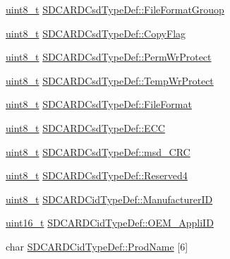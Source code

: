 \begin{DoxyCompactItemize}
\item 
\hyperlink{stdint_8h_aba7bc1797add20fe3efdf37ced1182c5}{uint8\-\_\-t} \hyperlink{group___p_i_o_s___s_d_c_a_r_d_ga19785f76dae23ac16c7af85cc6c88460}{S\-D\-C\-A\-R\-D\-Csd\-Type\-Def\-::\-File\-Format\-Grouop}
\item 
\hyperlink{stdint_8h_aba7bc1797add20fe3efdf37ced1182c5}{uint8\-\_\-t} \hyperlink{group___p_i_o_s___s_d_c_a_r_d_ga24efbbd2c557f214a8bfcec06ce30d19}{S\-D\-C\-A\-R\-D\-Csd\-Type\-Def\-::\-Copy\-Flag}
\item 
\hyperlink{stdint_8h_aba7bc1797add20fe3efdf37ced1182c5}{uint8\-\_\-t} \hyperlink{group___p_i_o_s___s_d_c_a_r_d_ga191082389493442ce0b103f97282b952}{S\-D\-C\-A\-R\-D\-Csd\-Type\-Def\-::\-Perm\-Wr\-Protect}
\item 
\hyperlink{stdint_8h_aba7bc1797add20fe3efdf37ced1182c5}{uint8\-\_\-t} \hyperlink{group___p_i_o_s___s_d_c_a_r_d_ga3a9535629b4573d3dbe39dabd51b341a}{S\-D\-C\-A\-R\-D\-Csd\-Type\-Def\-::\-Temp\-Wr\-Protect}
\item 
\hyperlink{stdint_8h_aba7bc1797add20fe3efdf37ced1182c5}{uint8\-\_\-t} \hyperlink{group___p_i_o_s___s_d_c_a_r_d_gaf227b9cb873b11bbee9ce41d8bcaa3d1}{S\-D\-C\-A\-R\-D\-Csd\-Type\-Def\-::\-File\-Format}
\item 
\hyperlink{stdint_8h_aba7bc1797add20fe3efdf37ced1182c5}{uint8\-\_\-t} \hyperlink{group___p_i_o_s___s_d_c_a_r_d_ga5e147c22c2995b291b7a5ea1a600c5a0}{S\-D\-C\-A\-R\-D\-Csd\-Type\-Def\-::\-E\-C\-C}
\item 
\hyperlink{stdint_8h_aba7bc1797add20fe3efdf37ced1182c5}{uint8\-\_\-t} \hyperlink{group___p_i_o_s___s_d_c_a_r_d_ga653812c0595db0ef3eddae3dbf409b87}{S\-D\-C\-A\-R\-D\-Csd\-Type\-Def\-::msd\-\_\-\-C\-R\-C}
\item 
\hyperlink{stdint_8h_aba7bc1797add20fe3efdf37ced1182c5}{uint8\-\_\-t} \hyperlink{group___p_i_o_s___s_d_c_a_r_d_ga2154190e5c6f32ce3b67bdc4a9aa3982}{S\-D\-C\-A\-R\-D\-Csd\-Type\-Def\-::\-Reserved4}
\item 
\hyperlink{stdint_8h_aba7bc1797add20fe3efdf37ced1182c5}{uint8\-\_\-t} \hyperlink{group___p_i_o_s___s_d_c_a_r_d_ga083dff8fb19fcec5bf79ab18c105b6c3}{S\-D\-C\-A\-R\-D\-Cid\-Type\-Def\-::\-Manufacturer\-I\-D}
\item 
\hyperlink{stdint_8h_a273cf69d639a59973b6019625df33e30}{uint16\-\_\-t} \hyperlink{group___p_i_o_s___s_d_c_a_r_d_gaba70fef7b702c2d5dc086c3cc997d4bc}{S\-D\-C\-A\-R\-D\-Cid\-Type\-Def\-::\-O\-E\-M\-\_\-\-Appli\-I\-D}
\item 
char \hyperlink{group___p_i_o_s___s_d_c_a_r_d_gab56e4945c8b076a1ea66737cbe18f5ce}{S\-D\-C\-A\-R\-D\-Cid\-Type\-Def\-::\-Prod\-Name} \mbox{[}6\mbox{]}

\end{DoxyCompactItemize}
